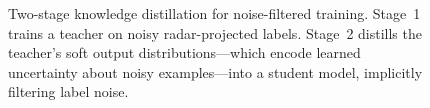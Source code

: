 \begin{figure}[t]

\caption{Two-stage knowledge distillation for noise-filtered training. Stage~1 trains a teacher on noisy radar-projected labels. Stage~2 distills the teacher's soft output distributions---which encode learned uncertainty about noisy examples---into a student model, implicitly filtering label noise.}
\label{fig:knowledge_distillation}
\end{figure}

